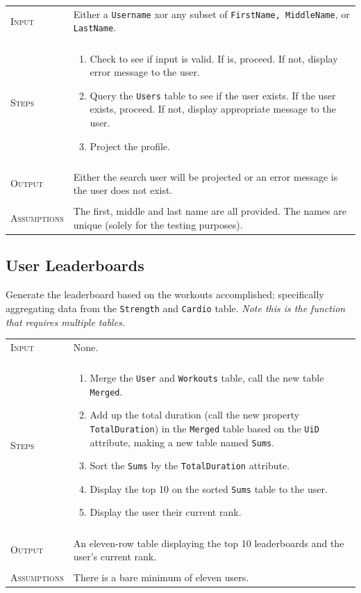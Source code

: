 \documentclass{article}
\newcommand{\br}{\multicolumn{2}{c}{} \\}
\begin{document}
\noindent
\begin{tabular}{l|p{9.5cm}}
\textsc{Input} & Either a \texttt{Username} xor any subset of \texttt{FirstName, MiddleName}, or \texttt{LastName}.\\
\br
\textsc{Steps} & \begin{enumerate}[topsep=0pt]
\item Check to see if input is valid. If is, proceed. If not, display error message to the user.
\item Query the \texttt{Users} table to see if the user exists. If the user exists, proceed. If not, display appropriate message to the user.
\item Project the profile.
\end{enumerate} \\
\br
\textsc{Output} & Either the search user will be projected or an error message is the user does not exist. \\
\br
\textsc{Assumptions} & The first, middle and last name are all provided. The names are unique (solely for the testing purposes).
\end{tabular}

\subsection*{User Leaderboards}
Generate the leaderboard based on the workouts accomplished; specifically aggregating data from the \texttt{Strength} and \texttt{Cardio} table. \textit{Note this is the function that requires multiple tables.}\\

\noindent
\begin{tabular}{l|p{9.5cm}}
\textsc{Input} & None. \\
\br
\textsc{Steps} & \begin{enumerate}[topsep=0pt]
\item Merge the \texttt{User} and \texttt{Workouts} table, call the new table \texttt{Merged}.
\item Add up the total duration (call the new property \texttt{TotalDuration}) in the \texttt{Merged} table based on the \texttt{UiD} attribute, making a new table named \texttt{Sums}.
\item Sort the \texttt{Sums} by the \texttt{TotalDuration} attribute.
\item Display the top 10 on the sorted \texttt{Sums} table to the user.
\item Display the user their current rank.
\end{enumerate} \\
\br
\textsc{Output} & An eleven-row table displaying the top 10 leaderboards and the user’s current rank. \\
\br
\textsc{Assumptions} & There is a bare minimum of eleven users.
\end{tabular}
\end{document}
